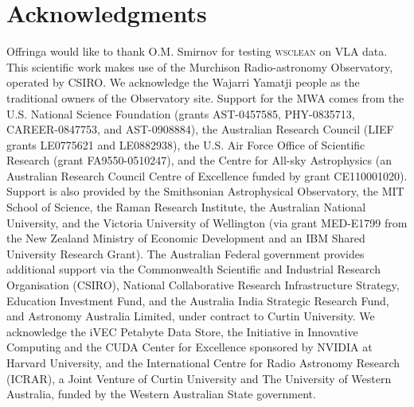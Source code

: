 \documentclass[useAMS,usenatbib]{mn2e}
\begin{document}
\section*{Acknowledgments}
Offringa would like to thank O.M. Smirnov for testing \textsc{wsclean} on VLA data.
This scientific work makes use of the Murchison Radio-astronomy Observatory, operated by CSIRO. We acknowledge the Wajarri Yamatji people as the traditional owners of the Observatory site. Support for the MWA comes from the U.S. National Science Foundation (grants AST-0457585, PHY-0835713, CAREER-0847753, and AST-0908884), the Australian Research Council (LIEF grants LE0775621 and LE0882938), the U.S. Air Force Office of Scientific Research (grant FA9550-0510247), and the Centre for All-sky Astrophysics (an Australian Research Council Centre of Excellence funded by grant CE110001020). Support is also provided by the Smithsonian Astrophysical Observatory, the MIT School of Science, the Raman Research Institute, the Australian National University, and the Victoria University of Wellington (via grant MED-E1799 from the New Zealand Ministry of Economic Development and an IBM Shared University Research Grant). The Australian Federal government provides additional support via the Commonwealth Scientific and Industrial Research Organisation (CSIRO), National Collaborative Research Infrastructure Strategy, Education Investment Fund, and the Australia India Strategic Research Fund, and Astronomy Australia Limited, under contract to Curtin University. We acknowledge the iVEC Petabyte Data Store, the Initiative in Innovative Computing and the CUDA Center for Excellence sponsored by NVIDIA at Harvard University, and the International Centre for Radio Astronomy Research (ICRAR), a Joint Venture of Curtin University and The University of Western Australia, funded by the Western Australian State government. 
\appendix
\end{document}
